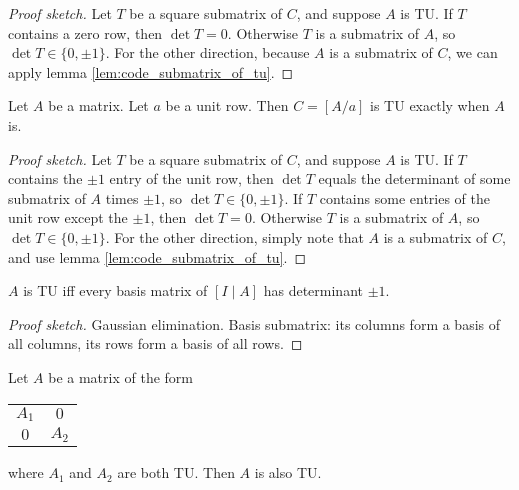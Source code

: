 \begin{proof}[Proof sketch]
  \leanok
  Let $T$ be a square submatrix of $C$, and suppose $A$ is TU. If $T$ contains a zero row, then $\det T = 0$. Otherwise $T$ is a submatrix of $A$, so $\det T \in \{0, \pm 1\}$.
  For the other direction, because $A$ is a submatrix of $C$, we can apply lemma \ref{lem:code_submatrix_of_tu}.
\end{proof}

\begin{lemma}
  \label{lem:code_tu_add_unit_row}
  Let $A$ be a matrix. Let $a$ be a unit row. Then $C = \left[ A / a \right]$ is TU exactly when $A$ is.
\end{lemma}

\begin{proof}[Proof sketch]
  Let $T$ be a square submatrix of $C$, and suppose $A$ is TU.
  If $T$ contains the $\pm 1$ entry of the unit row,
  then $\det T$ equals the determinant of some submatrix of $A$ times $\pm 1$,
  so $\det T \in \{0, \pm 1\}$.
  If $T$ contains some entries of the unit row except the $\pm 1$, then $\det T = 0$.
  Otherwise $T$ is a submatrix of $A$, so $\det T \in \{0, \pm 1\}$.
  For the other direction, simply note that $A$ is a submatrix of $C$, and use lemma \ref{lem:code_submatrix_of_tu}.
\end{proof}

\begin{lemma}
  \label{lem:code_tu_adjoin_id}
  \leanok
  $A$ is TU iff every basis matrix of $\left[ I \mid A \right]$ has determinant $\pm 1$.
\end{lemma}

\begin{proof}[Proof sketch]
  Gaussian elimination. Basis submatrix: its columns form a basis of all columns, its rows form a basis of all rows.
\end{proof}

\begin{lemma}
  \label{lem:code_diagonal_with_tu_blocks}
  \leanok
  Let $A$ be a matrix of the form
  \begin{tabular}{cc}
    \cline{1-2}
    \multicolumn{1}{|c|}{$A_{1}$} & \multicolumn{1}{c|}{    $0$} \\ \cline{1-2}
    \multicolumn{1}{|c|}{    $0$} & \multicolumn{1}{c|}{$A_{2}$} \\ \cline{1-2}
  \end{tabular}
  where $A_{1}$ and $A_{2}$ are both TU. Then $A$ is also TU.
\end{lemma}

